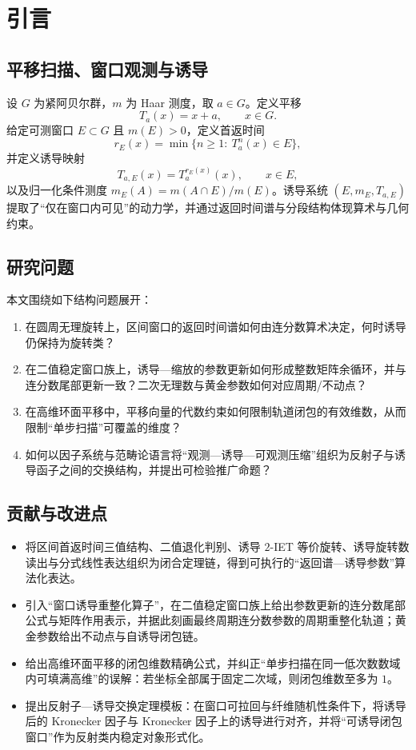 \section{引言}

\subsection{平移扫描、窗口观测与诱导}

设 $G$ 为紧阿贝尔群，$m$ 为 Haar 测度，取 $a\in G$。定义平移
\[
T_a(x)=x+a,\qquad x\in G.
\]
给定可测窗口 $E\subset G$ 且 $m(E)>0$，定义首返时间
\[
r_E(x)=\min\{n\ge 1:\ T_a^n(x)\in E\},
\]
并定义诱导映射
\[
T_{a,E}(x)=T_a^{r_E(x)}(x),\qquad x\in E,
\]
以及归一化条件测度 $m_E(A)=m(A\cap E)/m(E)$。诱导系统 $(E,m_E,T_{a,E})$ 提取了“仅在窗口内可见”的动力学，并通过返回时间谱与分段结构体现算术与几何约束。

\subsection{研究问题}

本文围绕如下结构问题展开：
\begin{enumerate}
  \item 在圆周无理旋转上，区间窗口的返回时间谱如何由连分数算术决定，何时诱导仍保持为旋转类？
  \item 在二值稳定窗口族上，诱导—缩放的参数更新如何形成整数矩阵余循环，并与连分数尾部更新一致？二次无理数与黄金参数如何对应周期/不动点？
  \item 在高维环面平移中，平移向量的代数约束如何限制轨道闭包的有效维数，从而限制“单步扫描”可覆盖的维度？
  \item 如何以因子系统与范畴论语言将“观测—诱导—可观测压缩”组织为反射子与诱导函子之间的交换结构，并提出可检验推广命题？
\end{enumerate}

\subsection{贡献与改进点}

\begin{itemize}
  \item 将区间首返时间三值结构、二值退化判别、诱导 $2$-IET 等价旋转、诱导旋转数读出与分式线性表达组织为闭合定理链，得到可执行的“返回谱—诱导参数”算法化表达。
  \item 引入“窗口诱导重整化算子”，在二值稳定窗口族上给出参数更新的连分数尾部公式与矩阵作用表示，并据此刻画最终周期连分数参数的周期重整化轨道；黄金参数给出不动点与自诱导闭包链。
  \item 给出高维环面平移的闭包维数精确公式，并纠正“单步扫描在同一低次数数域内可填满高维”的误解：若坐标全部属于固定二次域，则闭包维数至多为 $1$。
  \item 提出反射子—诱导交换定理模板：在窗口可拉回与纤维随机性条件下，将诱导后的 Kronecker 因子与 Kronecker 因子上的诱导进行对齐，并将“可诱导闭包窗口”作为反射类内稳定对象形式化。
\end{itemize}

